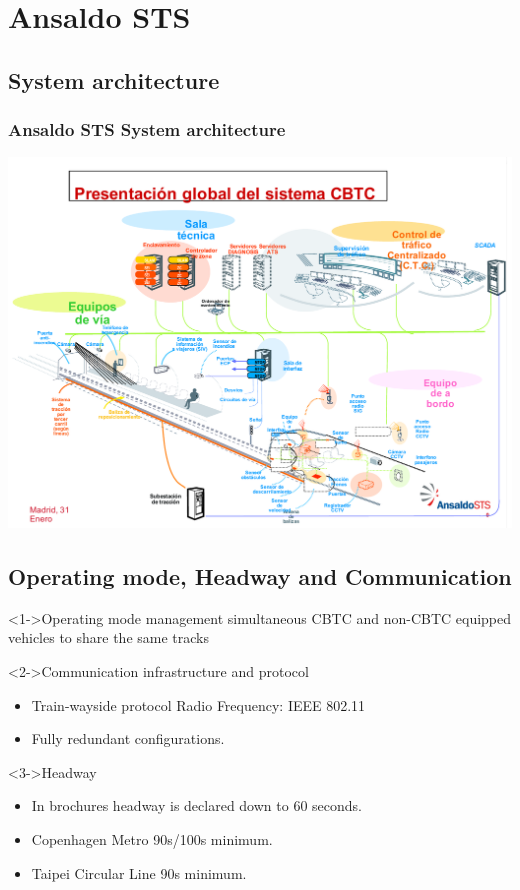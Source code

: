 

\section{Ansaldo STS}
\subsection{System architecture}
\frame
{
  \frametitle{Ansaldo STS System architecture}
 \begin{center}
	\includegraphics[scale=0.4]{./fig/AnsaldoSPsystem}
      \end{center}
   
}

\subsection{Operating mode, Headway and Communication}
\frame
{
\begin{block}<1->{Operating mode management}
simultaneous CBTC and non-CBTC equipped vehicles to share the same tracks
\end{block}

\begin{block}<2->{Communication infrastructure and protocol}
\begin{itemize}
\item  Train-wayside protocol Radio Frequency: IEEE 802.11 
\item  Fully redundant configurations.
\end{itemize}
\end{block}
\begin{block}<3->{Headway}
\begin{itemize}
\item In brochures headway is declared down to 60 seconds.
\item Copenhagen Metro  90s/100s minimum.
\item  Taipei Circular Line 90s minimum.
\end{itemize}

   \end{block}

}


